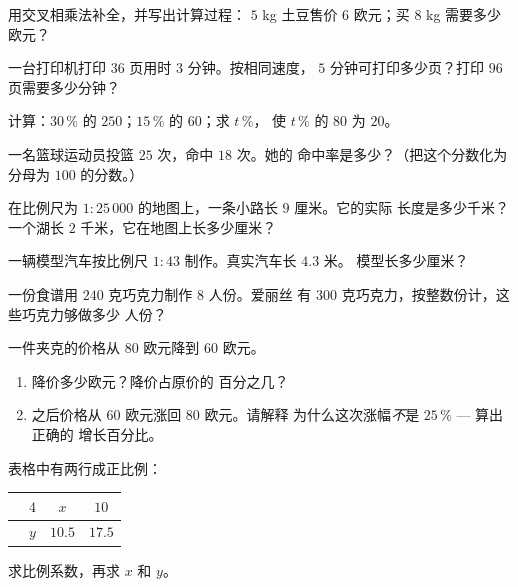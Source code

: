 \begin{exercise}[$\star$]\label{exo:g7:prop:2}
用交叉相乘法补全，并写出计算过程：
$5$ kg 土豆售价 $6$ 欧元；买 $8$ kg 需要多少欧元？
\end{exercise}

\begin{exercise}[$\star$]\label{exo:g7:prop:3}
一台打印机打印 $36$ 页用时 $3$ 分钟。按相同速度，
$5$ 分钟可打印多少页？打印 $96$ 页需要多少分钟？
\end{exercise}

\begin{exercise}[$\star$]\label{exo:g7:prop:4}
计算：$30\,\%$ 的 $250$；\quad $15\,\%$ 的 $60$；\quad 求 $t\,\%$，
使 $t\,\%$ 的 $80$ 为 $20$。
\end{exercise}

\begin{exercise}[$\star$]\label{exo:g7:prop:5}
一名篮球运动员投篮 $25$ 次，命中 $18$ 次。她的
命中率是多少？（把这个分数化为分母为 $100$ 的分数。）
\end{exercise}

\begin{exercise}[$\star$]\label{exo:g7:prop:6}
在比例尺为 $1 : 25\,000$ 的地图上，一条小路长 $9$ 厘米。它的实际
长度是多少千米？一个湖长 $2$ 千米，它在地图上长多少厘米？
\end{exercise}

\begin{exercise}[$\star$]\label{exo:g7:prop:7}
一辆模型汽车按比例尺 $1 : 43$ 制作。真实汽车长 $4.3$ 米。
模型长多少厘米？
\end{exercise}

\begin{exercise}[$\star\star$]\label{exo:g7:prop:8}
一份食谱用 $240$ 克巧克力制作 $8$ 人份。爱丽丝
有 $300$ 克巧克力，按整数份计，这些巧克力够做多少
人份？
\end{exercise}

\begin{exercise}[$\star\star$]\label{exo:g7:prop:9}
一件夹克的价格从 $80$ 欧元降到 $60$ 欧元。
\begin{enumerate}
  \item 降价多少欧元？降价占原价的
        百分之几？
  \item 之后价格从 $60$ 欧元涨回 $80$ 欧元。请解释
        为什么这次涨幅\emph{不}是 $25\,\%$ --- 算出正确的
        增长百分比。
\end{enumerate}
\end{exercise}

\begin{exercise}[$\star\star$]\label{exo:g7:prop:10}
表格中有两行成正比例：
\begin{center}
\renewcommand{\arraystretch}{1.2}
\begin{tabular}{l|ccc}
 & $4$ & $x$ & $10$ \\
\hline
 & $y$ & $10.5$ & $17.5$ \\
\end{tabular}
\end{center}
求比例系数，再求 $x$ 和 $y$。
\end{exercise}

